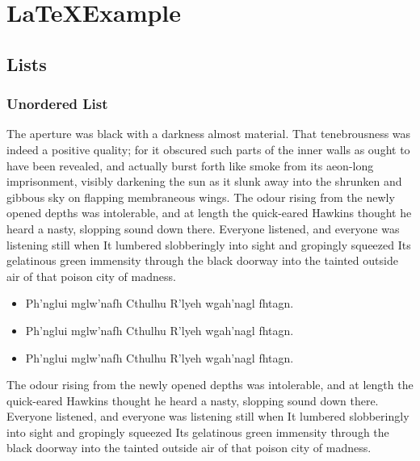 
\chapter{ \LaTeX Example}
\label{chap:example}

\section{Lists}
\label{sec:list}

\subsection{Unordered List}
\label{sec:unorderlist}

The aperture was black with a darkness almost material. That tenebrousness was indeed a positive quality; for it obscured such parts of the inner walls as ought to have been revealed, and actually burst forth like smoke from its aeon-long imprisonment, visibly darkening the sun as it slunk away into the shrunken and gibbous sky on flapping membraneous wings. The odour rising from the newly opened depths was intolerable, and at length the quick-eared Hawkins thought he heard a nasty, slopping sound down there. Everyone listened, and everyone was listening still when It lumbered slobberingly into sight and gropingly squeezed Its gelatinous green immensity through the black doorway into the tainted outside air of that poison city of madness. 


\begin{itemize}
  \item Ph'nglui mglw'nafh Cthulhu R'lyeh wgah'nagl fhtagn.
  \item Ph'nglui mglw'nafh Cthulhu R'lyeh wgah'nagl fhtagn.
  \item Ph'nglui mglw'nafh Cthulhu R'lyeh wgah'nagl fhtagn.
\end{itemize}

The odour rising from the newly opened depths was intolerable, and at length the quick-eared Hawkins thought he heard a nasty, slopping sound down there. Everyone listened, and everyone was listening still when It lumbered slobberingly into sight and gropingly squeezed Its gelatinous green immensity through the black doorway into the tainted outside air of that poison city of madness. 

